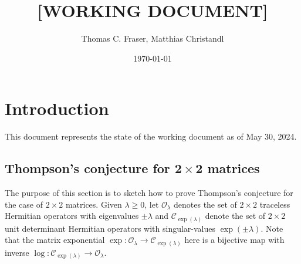 \documentclass[notitlepage]{article}
\author{Thomas C. Fraser, Matthias Christandl}
\date{\today}
\title{[WORKING DOCUMENT]}
\begin{document}
\maketitle


\section{Introduction}

{\color{blue} This document represents the state of the working document as of May 30, 2024.}

%

\subsection{Thompson's conjecture for \texorpdfstring{$\boldsymbol{2\times 2}$}{2 by 2} matrices}
\label{sec:2by2case_intuitively}

The purpose of this section is to sketch how to prove Thompson's conjecture for the case of $2\times 2$ matrices.
Given $\lambda \geq 0$, let $\mathcal O_{\lambda}$ denotes the set of $2\times 2$ traceless Hermitian operators with eigenvalues $\pm \lambda$ and $\mathcal C_{\exp(\lambda)}$ denote the set of $2\times 2$ unit determinant Hermitian operators with singular-values $\exp(\pm \lambda)$.
Note that the matrix exponential $\exp : \mathcal O_{\lambda} \to \mathcal C_{\exp(\lambda)}$ here is a bijective map with inverse $\log : \mathcal C_{\exp(\lambda)} \to \mathcal O_{\lambda}$.
\end{document}
